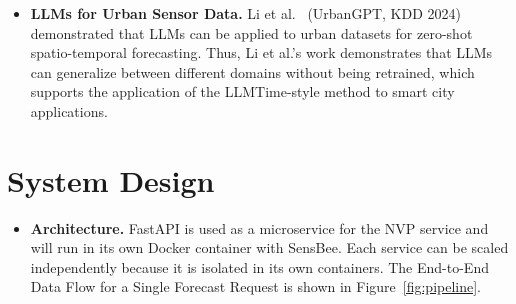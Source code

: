 \documentclass[11pt,a4paper]{article}
\begin{document}
\begin{itemize}[leftmargin=*,topsep=0pt,itemsep=-1ex,partopsep=1ex]
\item \textbf{LLMs for Urban Sensor Data.}
Li et al.~\cite{li2024urbangpt} (UrbanGPT, KDD 2024) demonstrated that LLMs can be applied to urban datasets for zero-shot spatio-temporal forecasting.
Thus, Li et al.'s work demonstrates that LLMs can generalize between different domains without being retrained, which supports the application of the LLMTime-style method to smart city applications.

\end{itemize}


\section{System Design}

\begin{itemize}[leftmargin=*]

\item \textbf{Architecture.}
FastAPI is used as a microservice for the NVP service and will run in its own Docker container with SensBee.
Each service can be scaled independently because it is isolated in its own containers.
The End-to-End Data Flow for a Single Forecast Request is shown in Figure~\ref{fig:pipeline}.


\end{itemize}
\end{document}
